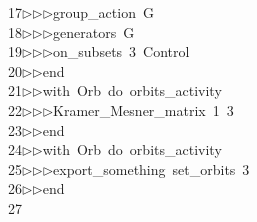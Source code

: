 \begin{tabbing}
17\>$\triangleright$\>$\triangleright$\>$\triangleright$\>group\_action\ G\ \\[0pt]
18\>$\triangleright$\>$\triangleright$\>$\triangleright$\>generators\ G\ \\[0pt]
19\>$\triangleright$\>$\triangleright$\>$\triangleright$\>on\_subsets\ 3\ Control\ \\[0pt]
20\>$\triangleright$\>$\triangleright$\>end\ \\[0pt]
21\>$\triangleright$\>$\triangleright$\>with\ Orb\ do\ orbits\_activity\ \\[0pt]
22\>$\triangleright$\>$\triangleright$\>$\triangleright$\>Kramer\_Mesner\_matrix\ 1\ 3\ \\[0pt]
23\>$\triangleright$\>$\triangleright$\>end\ \\[0pt]
24\>$\triangleright$\>$\triangleright$\>with\ Orb\ do\ orbits\_activity\ \\[0pt]
25\>$\triangleright$\>$\triangleright$\>$\triangleright$\>export\_something\ set\_orbits\ 3\ \\[0pt]
26\>$\triangleright$\>$\triangleright$\>end\ \\[0pt]
27\>\end{tabbing}

